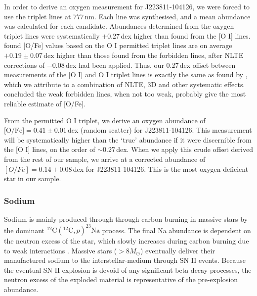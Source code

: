 \documentclass{emulateapj}
\begin{document}
In order to derive an oxygen measurement for J223811-104126, we were forced to use the triplet lines at 777\,nm. Each line was synthesised, and a mean abundance was calculated for each candidate. Abundances determined from the oxygen triplet lines were systematically $+0.27$\,dex higher than found from the [O \textsc{I}] lines. \citet{perez;et-al_2006} found [O/Fe] values based on the O \textsc{I} permitted triplet lines are on average $+0.19 \pm 0.07$\,dex higher than those found from the forbidden lines, after NLTE corrections of $-$0.08\,dex had been applied.  Thus, our 0.27\,dex offset between measurements of the [O \textsc{I}] and O \textsc{I} triplet lines is exactly the same as found by \citet{perez;et-al_2006}, which we attribute to a combination of NLTE, 3D and other systematic effects. \citet{perez;et-al_2006} concluded the weak forbidden lines, when not too weak, probably give the most reliable estimate of [O/Fe].

From the permitted O \textsc{I} triplet, we derive an oxygen abundance of $\mbox{[O/Fe]} = 0.41 \pm 0.01$\,dex (random scatter) for J223811-104126. This measurement will be systematically higher than the `true' abundance if it were discernible from the [O \textsc{I}] lines, on the order of $\sim{}$0.27\,dex. When we apply this crude offset derived from the rest of our sample, we arrive at a corrected abundance of $[O/Fe] = 0.14 \pm 0.08$\,dex for J223811-104126. This is the most oxygen-deficient star in our sample.


\subsubsection{Sodium}

Sodium is mainly produced through through carbon burning in massive stars by the dominant $^{12}\mbox{C}(^{12}\mbox{C}, p)^{23}\mbox{Na}$ process. The final Na abundance is dependent on the neutron excess of the star, which slowly increases during carbon burning due to weak interactions \citep{arnett;truran_1974}. Massive stars ($>8 M_\odot$) eventually deliver their manufactured sodium to the interstellar-medium through SN II events. Because the eventual SN II explosion is devoid of any significant beta-decay processes, the neutron excess of the exploded material is representative of the pre-explosion abundance.  
  
\end{document}
